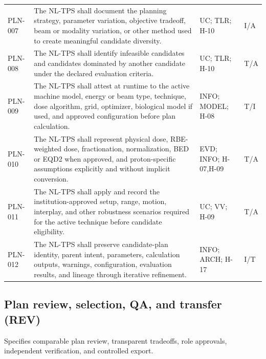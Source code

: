 \documentclass[11pt,letterpaper]{article}
\begin{document}
\begin{small}
\begin{longtable}{@{}L{0.0806\textwidth}L{0.5386\textwidth}L{0.1868\textwidth}L{0.1140\textwidth}@{}}
\addlinespace[2pt]
PLN-007 & The NL-TPS shall document the planning strategy, parameter variation, objective tradeoff, beam or modality variation, or other method used to create meaningful candidate diversity. & UC; TLR; H-10 & I\slash\allowbreak{}A \\
\addlinespace[2pt]
PLN-008 & The NL-TPS shall identify infeasible candidates and candidates dominated by another candidate under the declared evaluation criteria. & UC; TLR; H-10 & T\slash\allowbreak{}A \\
\addlinespace[2pt]
PLN-009 & The NL-TPS shall attest at runtime to the active machine model, energy or beam type, technique, dose algorithm, grid, optimizer, biological model if used, and approved configuration before plan calculation. & INFO; MODEL; H-08 & T\slash\allowbreak{}I \\
\addlinespace[2pt]
PLN-010 & The NL-TPS shall represent physical dose, RBE-weighted dose, fractionation, normalization, BED or EQD2 when approved, and proton-specific assumptions explicitly and without implicit conversion. & EVD; INFO; H-07,H-09 & T\slash\allowbreak{}A \\
\addlinespace[2pt]
PLN-011 & The NL-TPS shall apply and record the institution-approved setup, range, motion, interplay, and other robustness scenarios required for the active technique before candidate eligibility. & UC; VV; H-09 & T\slash\allowbreak{}A \\
\addlinespace[2pt]
PLN-012 & The NL-TPS shall preserve candidate-plan identity, parent intent, parameters, calculation outputs, warnings, configuration, evaluation results, and lineage through iterative refinement. & INFO; ARCH; H-17 & I\slash\allowbreak{}T \\
\end{longtable}
\end{small}

\subsection{Plan review, selection, QA, and transfer (REV)}

Specifies comparable plan review, transparent tradeoffs, role approvals, independent verification, and controlled export.
\end{document}

